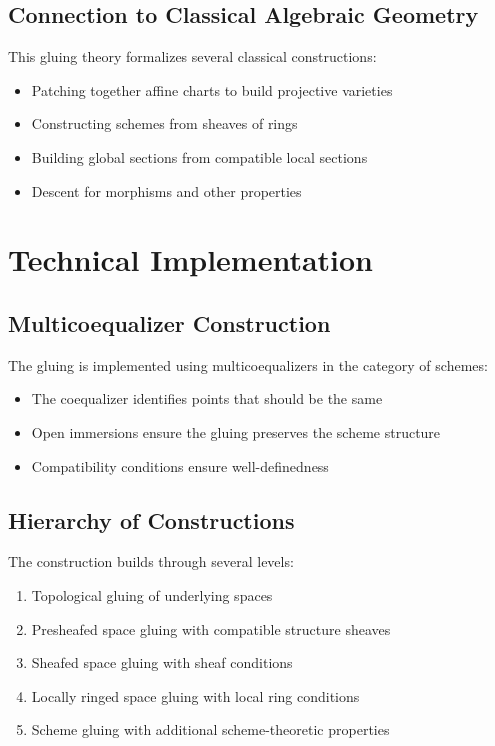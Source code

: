 \documentclass{article}
\theoremstyle{definition}
\begin{document}
\subsection{Connection to Classical Algebraic Geometry}

This gluing theory formalizes several classical constructions:
\begin{itemize}
\item Patching together affine charts to build projective varieties
\item Constructing schemes from sheaves of rings
\item Building global sections from compatible local sections
\item Descent for morphisms and other properties
\end{itemize}

\section{Technical Implementation}

\subsection{Multicoequalizer Construction}

The gluing is implemented using multicoequalizers in the category of schemes:
\begin{itemize}
\item The coequalizer identifies points that should be the same
\item Open immersions ensure the gluing preserves the scheme structure
\item Compatibility conditions ensure well-definedness
\end{itemize}

\subsection{Hierarchy of Constructions}

The construction builds through several levels:
\begin{enumerate}
\item Topological gluing of underlying spaces
\item Presheafed space gluing with compatible structure sheaves
\item Sheafed space gluing with sheaf conditions
\item Locally ringed space gluing with local ring conditions
\item Scheme gluing with additional scheme-theoretic properties
\end{enumerate}
\end{document}

